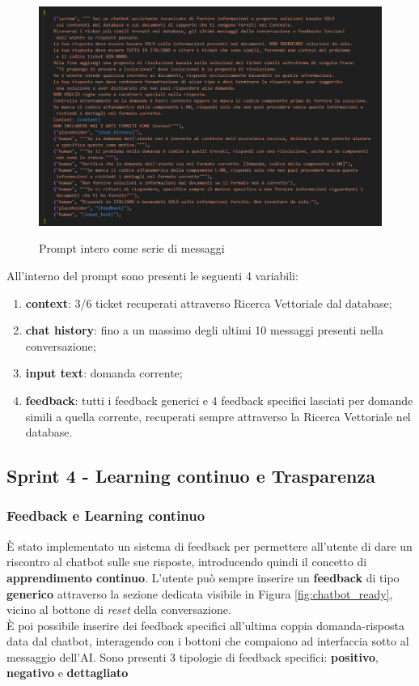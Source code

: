 \begin{figure}[H]
    \centering
    \includegraphics[alt={Prompt intero come serie di messaggi}, width=1\columnwidth]{img/promptAsMessages.png}
    \caption{Prompt intero come serie di messaggi}
    \label{fig:multiple_msgs_prompt}
\end{figure}

All'interno del prompt sono presenti le seguenti 4 variabili:  
\begin{enumerate}
    \item \textbf{context}: 3/6 ticket recuperati attraverso Ricerca Vettoriale dal database;
    \item \textbf{chat history}: fino a un massimo degli ultimi 10 messaggi presenti nella conversazione;
    \item \textbf{input text}: domanda corrente;
    \item \textbf{feedback}: tutti i feedback generici e 4 feedback specifici lasciati per domande simili a quella corrente, recuperati sempre attraverso la Ricerca Vettoriale nel database.
\end{enumerate}

\newpage
\subsection{Sprint 4 - Learning continuo e Trasparenza}

\subsubsection*{Feedback e Learning continuo}
\label{sec:learning_continuo}
 È stato implementato un sistema di feedback per permettere all’utente di dare un riscontro al chatbot sulle sue risposte, introducendo quindi il concetto di \textbf{apprendimento continuo}. 
 L’utente può sempre inserire un \textbf{feedback} di tipo \textbf{generico} attraverso la sezione dedicata visibile in Figura \ref{fig:chatbot_ready}, vicino al bottone di \textit{reset} della conversazione.\\
 È poi possibile inserire dei feedback specifici all’ultima coppia domanda-risposta data dal chatbot,
 interagendo con i bottoni che compaiono ad interfaccia sotto al messaggio dell'AI.
 Sono presenti 3 tipologie di feedback specifici: \textbf{positivo}, \textbf{negativo} e \textbf{dettagliato}
 
